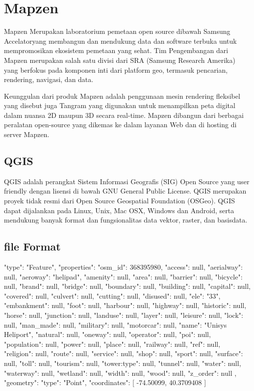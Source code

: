 \section{Mapzen}
Mapzen Merupakan laboratorium pemetaan open source dibawah Samsung Accelatoryang membangun dan mendukung data dan software terbuka untuk mempromosikan ekosistem pemetaan yang sehat. Tim Pengembangan dari Mapzen merupakan salah satu divisi dari SRA (Samsung Research Amerika) yang berfokus pada komponen inti dari platform geo, termasuk pencarian, rendering, navigasi, dan data.

Keunggulan dari produk Mapzen adalah penggunaan mesin rendering fleksibel yang disebut juga Tangram yang digunakan untuk menampilkan peta digital dalam nuansa 2D maupun 3D secara real-time. Mapzen dibangun dari berbagai peralatan open-source yang dikemas ke dalam layanan Web dan di hosting di server Mapzen.

\subsection{QGIS}
QGIS adalah perangkat Sistem Informasi Geografis (SIG) Open Source yang user friendly dengan lisensi di bawah GNU General Public License. QGIS merupakan proyek tidak resmi dari Open Source Geospatial Foundation (OSGeo). QGIS dapat dijalankan pada Linux, Unix, Mac OSX, Windows dan Android, serta mendukung banyak format dan fungsionalitas data vektor, raster, dan basisdata.

\subsection{file Format}
{
"type": "Feature",
"properties": {
    "osm_id": 368395980,
    "access": null,
    "aerialway": null,
    "aeroway": "helipad",
    "amenity": null,
    "area": null,
    "barrier": null,
    "bicycle": null,
    "brand": null,
    "bridge": null,
    "boundary": null,
    "building": null,
    "capital": null,
    "covered": null,
    "culvert": null,
    "cutting": null,
    "disused": null,
    "ele": "33",
    "embankment": null,
    "foot": null,
    "harbour": null,
    "highway": null,
    "historic": null,
    "horse": null,
    "junction": null,
    "landuse": null,
    "layer": null,
    "leisure": null,
    "lock": null,
    "man_made": null,
    "military": null,
    "motorcar": null,
    "name": "Unisys Heliport",
    "natural": null,
    "oneway": null,
    "operator": null,
    "poi": null,
    "population": null,
    "power": null,
    "place": null,
    "railway": null,
    "ref": null,
    "religion": null,
    "route": null,
    "service": null,
    "shop": null,
    "sport": null,
    "surface": null,
    "toll": null,
    "tourism": null,
    "tower:type": null,
    "tunnel": null,
    "water": null,
    "waterway": null,
    "wetland": null,
    "width": null,
    "wood": null,
    "z_order": null
},
"geometry": {
    "type": "Point",
    "coordinates": [
        -74.50099,
        40.3709408
    ]
}
}

